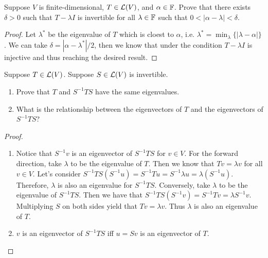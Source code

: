 \documentclass{extarticle}
\begin{document}
\begin{problem}{11}
    Suppose \(V\) is finite-dimensional, \(T \in \mathcal{L}(V)\), and \(\alpha \in \mathbb{F}\). Prove that 
    there exists \(\delta > 0\) such that \(T - \lambda I\) is invertible for all \(\lambda \in \mathbb{F}\)
    such that \(0 < |\alpha - \lambda| < \delta\).
\end{problem}

\begin{proof}
Let \(\lambda^*\) be the eigenvalue of \(T\) which is cloest to \(\alpha\), i.e. \(\lambda^* = \min_\lambda\{
    |\lambda - \alpha|\}\). We can take \(\delta = |\alpha - \lambda^*|/2\), then we know that 
    under the condition \(T - \lambda I\) is injective and thus reaching the desired result. 
\end{proof}

\begin{problem}{13}
    Suppose \(T \in \mathcal{L}(V)\). Suppose \(S \in \mathcal{L}(V)\) is invertible. 
    \begin{enumerate}[label=(\alph*)]
        \item Prove that \(T\) and \(S^{-1}TS\) have the same eigenvalues. 
        \item What is the relationship between the eigenvectors of \(T\) and the eigenvectors of \(S^{-1}TS\)?
    \end{enumerate}
\end{problem}

\begin{proof}
\begin{enumerate}[label=(\alph*)]
    \item Notice that \(S^{-1}v\) is an eigenvector of \(S^{-1}TS\) for \(v \in V\). For the
    forward direction, take \(\lambda\) to be the eigenvalue of \(T\). Then we know that \(Tv = 
    \lambda v\) for all \(v \in V\). Let's consider \(S^{-1}TS (S^{-1}u) = S^{-1}Tu = S^{-1} \lambda u 
    = \lambda (S^{-1} u)\). Therefore, \(\lambda\) is also an eigenvalue for \(S^{-1}TS\). 
    Conversely, take \(\lambda\) to be the eigenvalue of \(S^{-1}TS\). Then we have that 
    \(S^{-1}TS (S^{-1}v) = S^{-1}Tv = \lambda S^{-1}v\). Multiplying \(S\) on both sides yield 
    that \(Tv = \lambda v\). Thus \(\lambda\) is also an eigenvalue of \(T\). 
    
    \item  \(v\) is an eigenvector of \(S^{-1}TS\) iff \(u = Sv\) is an eigenvector of \(T\).
\end{enumerate}
\end{proof}
\end{document}
